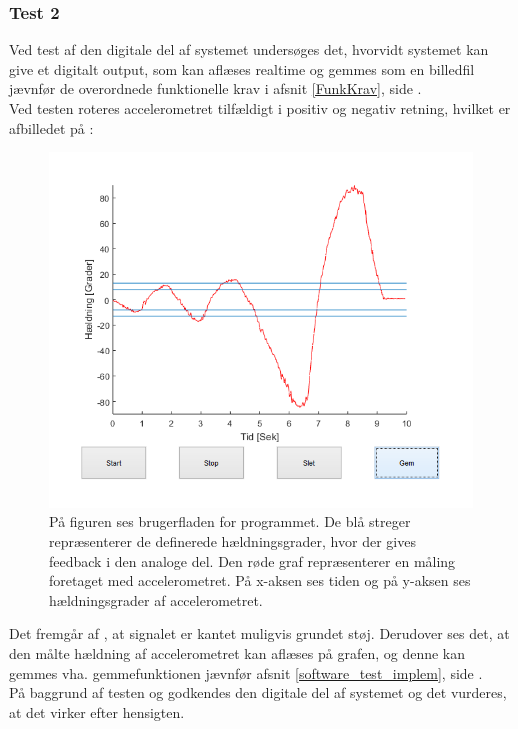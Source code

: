 \subsubsection{Test 2}
Ved test af den digitale del af systemet undersøges det, hvorvidt systemet kan give et digitalt output, som kan aflæses realtime og gemmes som en billedfil jævnfør de overordnede funktionelle krav i afsnit \ref{FunkKrav}, side \pageref{FunkKrav}. \\
Ved testen roteres accelerometret tilfældigt i positiv og negativ retning, hvilket er afbilledet på :
\begin{figure}[H]
	\centering
	\includegraphics[scale=.6]{figures/cProblemloesning/Software.jpg}
	\caption{På figuren ses brugerfladen for programmet. De blå streger repræsenterer de definerede hældningsgrader, hvor der gives feedback i den analoge del. Den røde graf repræsenterer en måling foretaget med accelerometret. På x-aksen ses tiden og på y-aksen ses hældningsgrader af accelerometret.}
	\label{fig:samlet_system_digital}
\end{figure}
\noindent Det fremgår af , at signalet er kantet muligvis grundet støj. Derudover ses det, at den målte hældning af accelerometret kan aflæses på grafen, og denne kan gemmes vha. gemmefunktionen jævnfør afsnit \ref{software_test_implem}, side \pageref{software_test_implem}.\\
På baggrund af testen og   godkendes den digitale del af systemet og det vurderes, at det virker efter hensigten.